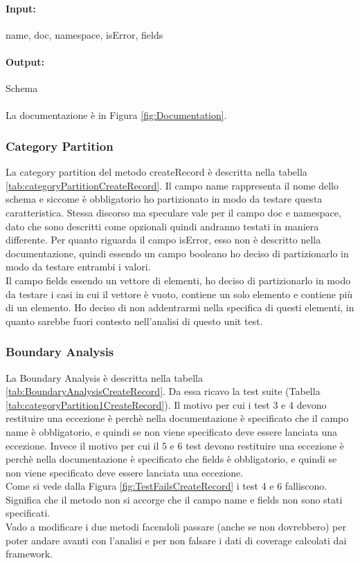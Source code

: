 \documentclass[10pt, a4paper]{article}
\begin{document}
\paragraph{Input:} name, doc, namespace, isError, fields

\paragraph{Output:} Schema \\ \\
La documentazione è in Figura \ref{fig:Documentation}.

\subsubsection{Category Partition}
La category partition del metodo createRecord è descritta nella tabella \ref{tab:categoryPartitionCreateRecord}.
Il campo name rappresenta il nome dello schema e siccome è obbligatorio ho partizionato in modo da testare questa caratteristica.
Stessa discorso ma speculare vale per il campo doc e namespace, dato che sono descritti come opzionali 
quindi andranno testati in maniera differente.
Per quanto riguarda il campo isError, esso non è descritto nella documentazione, quindi essendo un campo booleano
ho deciso di partizionarlo in modo da testare entrambi i valori.\\
Il campo fields essendo un vettore di elementi, ho deciso di partizionarlo in modo da testare i casi in cui il vettore
è vuoto, contiene un solo elemento e contiene più di un elemento. Ho deciso di non addentrarmi nella specifica di 
questi elementi, in quanto sarebbe fuori contesto nell'analisi di questo unit test.
\subsubsection{Boundary Analysis}

La Boundary Analysis è descritta nella tabella \ref{tab:BoundaryAnalysisCreateRecord}. 
Da essa ricavo la test suite (Tabella \ref{tab:categoryPartition1CreateRecord}).
Il motivo per cui i test 3 e 4 devono restituire una eccezione è perchè nella documentazione è specificato che
il campo name è obbligatorio, e quindi se non viene specificato deve essere lanciata una eccezione.
Invece il motivo per cui il 5 e 6 test devono restituire una eccezione è perchè nella documentazione è specificato che
fields è obbligatorio, e quindi se non viene specificato deve essere lanciata una eccezione. \\
Come si vede dalla Figura \ref{fig:TestFailsCreateRecord} i test 4 e 6 falliscono. Significa che il metodo non si accorge
che il campo name e fields non sono stati specificati. \\
Vado a modificare i due metodi facendoli passare (anche se non dovrebbero) per poter andare avanti con l'analisi e 
per non falsare i dati di coverage calcolati dai framework.
\end{document}

